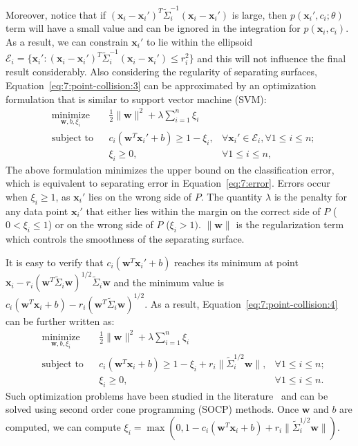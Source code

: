 Moreover, notice that if $(\mathbf x_i - \mathbf x_i')^T \widetilde{\Sigma}_i^{-1} (\mathbf x_i - \mathbf x_i')$ is large, then $p(\mathbf x_i', c_i; \theta)$ term
will have a small value and can be ignored in the integration for $p(\mathbf x_i, c_i)$. As a result, we can constrain $\mathbf x_i'$ to lie within the
ellipsoid $\mathcal{E}_i = \{\mathbf x_i': (\mathbf x_i - \mathbf x_i')^T \widetilde{\Sigma}_i^{-1} (\mathbf x_i - \mathbf x_i') \leq r_i^2\}$ and this will not influence
the final result considerably. Also considering the regularity of separating surfaces, Equation~\ref{eq:7:point-collision:3} can be approximated by an optimization
formulation that is similar to support vector machine (SVM):
\begin{equation}
\label{eq:7:point-collision:4}
\begin{aligned}
	& \underset{\mathbf w, b, \xi_i}{\text{minimize}}
	& & \frac{1}{2}\|\mathbf w\|^2 + \lambda \sum_{i=1}^n \xi_i \\
	& \text{subject to}
	& & c_i(\mathbf w^T \mathbf x_i' + b) \geq 1 - \xi_i, & \forall \mathbf x_i' \in \mathcal{E}_i, \forall 1 \leq i \leq n; \\
    & & & \xi_i \geq 0, & \forall 1 \leq i \leq n,
	\end{aligned}
	\end{equation}
The above formulation minimizes the upper bound on the classification error, which is equivalent to separating error in Equation~\ref{eq:7:error}. Errors occur when $\xi_i \geq 1$, as $\mathbf x_i'$ lies on the wrong side of $P$. The quantity $\lambda$ is the penalty for any data point $\mathbf x_i'$ that either lies within the margin on the correct side of $P$ ($0 < \xi_i \leq 1$) or on the wrong side of $P$ ($\xi_i > 1)$. $\|\mathbf w\|$ is the regularization term which controls the smoothness of the separating surface.

It is easy to verify that $c_i(\mathbf w^T \mathbf x_i' + b)$ reaches its minimum at point $\mathbf x_i - r_i (\mathbf w^T \widetilde{\Sigma}_i \mathbf w)^{1/2}\widetilde{\Sigma}_i \mathbf w$ and the minimum value is $c_i(\mathbf w^T \mathbf x_i + b) - r_i (\mathbf w^T \widetilde{\Sigma}_i \mathbf w)^{1/2}$.   As a result,
Equation~\ref{eq:7:point-collision:4} can be further written as:
\begin{equation}
\label{eq:7:point-collision:5}
\begin{aligned}
	& \underset{\mathbf w, b, \xi_i}{\text{minimize}}
	& & \frac{1}{2}\|\mathbf w\|^2 + \lambda \sum_{i=1}^n \xi_i \\
	& \text{subject to}
	& & c_i(\mathbf w^T \mathbf x_i + b) \geq 1 - \xi_i + r_i \|\widetilde{\Sigma}_i^{1/2} \mathbf w \|, & \forall 1 \leq i \leq n; \\
    & & & \xi_i \geq 0, & \forall 1 \leq i \leq n.
	\end{aligned}
	\end{equation}
Such optimization problems have been studied in the literature~\cite{Shivaswamy:2006:SOC} and can be solved using second order cone programming (SOCP)
methods. Once $\mathbf w$ and $b$ are computed, we can compute $\xi_i = \max(0, 1 - c_i(\mathbf w^T \mathbf x_i + b) + r_i \|\widetilde{\Sigma}_i^{1/2}\mathbf w\|)$.


